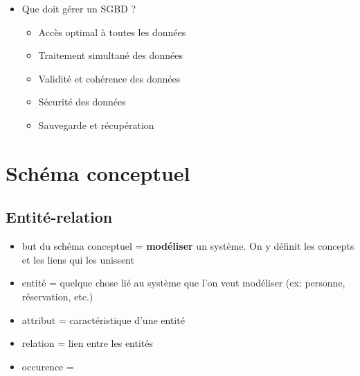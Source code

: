 \documentclass[a4paper]{article}
\begin{document}
\begin{itemize}
\item Que doit gérer un SGBD ?
\begin{example}
    \begin{itemize}
        \item Accès optimal à toutes les données
        \item Traitement simultané des données
        \item Validité et cohérence des données
        \item Sécurité des données
        \item Sauvegarde et récupération
    \end{itemize}
\end{example}



\end{itemize}















\section{Schéma conceptuel}










\subsection{Entité-relation}





\begin{itemize}



\item but du schéma conceptuel = \textbf{modéliser} un système. On y définit les concepts et les liens qui les unissent



\item entité = quelque chose lié au système que l'on veut modéliser (ex: personne, réservation, etc.)



\item attribut = caractéristique d'une entité



\item relation = lien entre les entités



\item occurence = 



\end{itemize}
\end{document}
